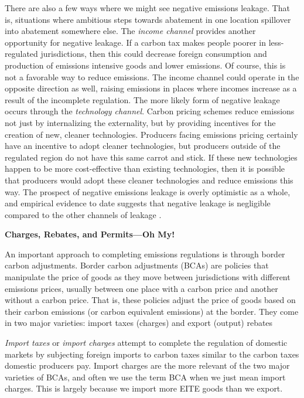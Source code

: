 There are also a few ways where we might see negative emissions leakage. That is, situations where ambitious steps towards abatement in one location spillover into abatement somewhere else. The \emph{income channel} provides another opportunity for negative leakage. If a carbon tax makes people poorer in less-regulated jurisdictions, then this could decrease foreign consumption and production of emissions intensive goods and lower emissions. Of course, this is not a favorable way to reduce emissions. The income channel could operate in the opposite direction as well, raising emissions in places where incomes increase as a result of the incomplete regulation. The more likely form of negative leakage occurs through the \emph{technology channel}. Carbon pricing schemes reduce emissions not just by internalizing the externality, but by providing incentives for the creation of new, cleaner technologies. Producers facing emissions pricing certainly have an incentive to adopt cleaner technologies, but producers outside of the regulated region do not have this same carrot and stick. If these new technologies happen to be more cost-effective than existing technologies, then it is possible that producers would adopt these cleaner technologies and reduce emissions this way. The prospect of negative emissions leakage is overly optimistic as a whole, and empirical evidence to date suggests that negative leakage is negligible compared to the other channels of leakage \citep{winchester2013numerical}.

\textbf{Charges, Rebates, and Permits---Oh My!}

An important approach to completing emissions regulations is through border carbon adjustments. Border carbon adjustments (BCAs) are policies that manipulate the price of goods as they move between jurisdictions with different emissions prices, usually between one place with a carbon price and another without a carbon price. That is, these policies adjust the price of goods based on their carbon emissions (or carbon equivalent emissions) at the border. They come in two major varieties: import taxes (charges) and export (output) rebates

\emph{Import taxes} or \emph{import charges} attempt to complete the regulation of domestic markets by subjecting foreign imports to carbon taxes similar to the carbon taxes domestic producers pay. Import charges are the more relevant of the two major varieties of BCAs, and often we use the term BCA when we just mean import charges. This is largely because we import more EITE goods than we export. 

